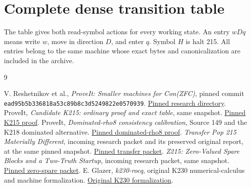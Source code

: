 \documentclass[11pt]{article}
\begin{document}
\appendix
\section{Complete dense transition table}

The table gives both read-symbol actions for every working state. An entry $wDq$ means write $w$, move in direction $D$, and enter $q$. Symbol $H$ is halt 215. All entries belong to the same machine whose exact bytes and canonicalization are included in the archive.



\begin{thebibliography}{9}
\small\raggedright\setlength{\itemsep}{2pt}
 V. Reshetnikov et al., \emph{ProveIt: Smaller machines for Con(ZFC)}, pinned commit \texttt{ead95b5b336818a53c89b8c3d5249822e0570939}. \href{https://github.com/VladimirReshetnikov/ProveIt/tree/ead95b5b336818a53c89b8c3d5249822e0570939/Computability/BusyBeaver/Research/ZFC}{Pinned research directory}.
 ProveIt, \emph{Candidate K215: ordinary proof and exact table}, same snapshot. \href{https://github.com/VladimirReshetnikov/ProveIt/blob/ead95b5b336818a53c89b8c3d5249822e0570939/Computability/BusyBeaver/Research/ZFC/candidate-k215/proof.md}{Pinned K215 proof}.
 ProveIt, \emph{Dominated-rho8 consistency calibration}, Source 149 and the K218 dominated alternative. \href{https://github.com/VladimirReshetnikov/ProveIt/blob/ead95b5b336818a53c89b8c3d5249822e0570939/Computability/BusyBeaver/Research/ZFC/candidate-k218/alternatives/dominated/proof.md}{Pinned dominated-rho8 proof}.
 \emph{Transfer Pop 215 Materially Different}, incoming research packet and its preserved original report, at the same pinned snapshot. \href{https://github.com/VladimirReshetnikov/ProveIt/blob/ead95b5b336818a53c89b8c3d5249822e0570939/docs/incoming/Transfer_Pop_215_Materially_Different_2026-10-21.zip}{Pinned transfer packet}.
 \emph{Z215: Zero-Valued Spare Blocks and a Two-Truth Startup}, incoming research packet, same snapshot. \href{https://github.com/VladimirReshetnikov/ProveIt/blob/ead95b5b336818a53c89b8c3d5249822e0570939/docs/incoming/Z215_Zero_Spare_2026-10-21.zip}{Pinned zero-spare packet}.
 E. Glazer, \emph{k230-rocq}, original K230 numerical-calculus and machine formalization. \href{https://github.com/elliotglazer/k230-rocq}{Original K230 formalization}.
\end{thebibliography}
\end{document}
